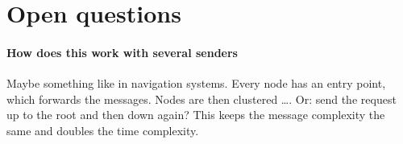\documentclass{article}
\begin{document}
\section{Open questions}

\paragraph{How does this work with several senders} 
Maybe something like in navigation systems. Every node has an entry
point, which forwards the messages. Nodes are then clustered
\ldots. Or: send the request up to the root and then down again? This
keeps the message complexity the same and doubles the time
complexity. 

\newpage



\label{LastPage}
\end{document}
